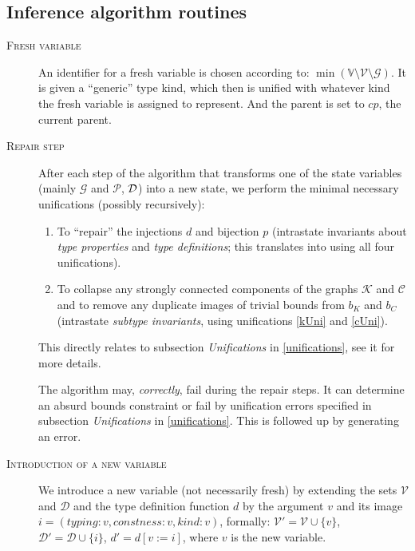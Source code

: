 \subsection{Inference algorithm routines}
\label{sec:inferRoutines}

\begin{description}
    \item[\textsc{Fresh variable}] An identifier for a fresh variable is chosen according to: \linebreak $\min \left(\mathbb{V} \setminus \mathcal{V} \setminus \mathcal{G}\right)$. It is given a ``generic'' type kind, which then is unified with whatever kind the fresh variable is assigned to represent. And the parent is set to $cp$, the current parent.

    \item[\textsc{Repair step}] After each step of the algorithm that transforms one of the state variables (mainly $\mathcal{G}$ and $\mathcal{P}$, $\mathcal{D}$) into a new state, we perform the minimal necessary unifications (possibly recursively):

    \begin{enumerate}
        \item To ``repair'' the injections $d$ and bijection $p$ (intrastate invariants about \emph{type properties} and \emph{type definitions}; this translates into using all four unifications).

        \item To collapse any strongly connected components of the graphs $\mathcal{K}$ and  $\mathcal{C}$ and to remove any duplicate images of trivial bounds from $b_K$ and $b_C$ (intrastate \emph{subtype invariants}, using unifications \ref{kUni} and \ref{cUni}).
    \end{enumerate}

    This directly relates to subsection \emph{Unifications} in \cref{unifications}, see it for more details.

    The algorithm may, \emph{correctly}, fail during the repair steps. It can determine an absurd bounds constraint or fail by unification errors specified in subsection \emph{Unifications} in \cref{unifications}. This is followed up by generating an error.

    \item[\textsc{Introduction of a new variable}] We introduce a new variable (not necessarily fresh) by extending the sets $\mathcal{V}$ and $\mathcal{D}$ and the type definition function $d$ by the argument $v$ and its image $i = (typing: v, constness: v, kind: v)$, formally: $\mathcal{V}' = \mathcal{V} \cup \{v\}$, $\mathcal{D}' = \mathcal{D} \cup \{i\}$, $d' = d [v := i]$, where $v$ is the new variable.


\end{description}
